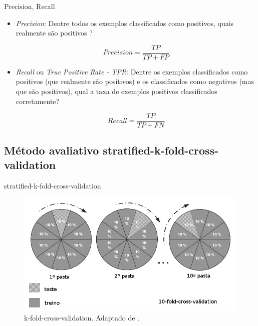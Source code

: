 \documentclass[brazil]{beamer}
\begin{document}
\begin{frame}{Precision, Recall \cite{Davis:2006}}
   \begin{itemize}
      \item <1 ->\textit{Precision}: Dentre todos os exemplos classificados como positivos, quais realmente são positivos ? 

\begin{equation} 
  Precision = \frac{TP}{TP+FP}
  \label{eq:precision}
\end{equation}

      \item <2 ->\textit{Recall} ou \textit{True Positive Rate - TPR}: Dentre os exemplos classificados como positivos (que realmente são positivos) e os classificados como negativos (mas que são positivos), qual a taxa de exemplos positivos classificados corretamente?

\begin{equation} 
  Recall = \frac{TP}{TP+FN} 
  \label{eq:recall}
\end{equation}

   \end{itemize}
\end{frame}


\subsection{Método avaliativo stratified-k-fold-cross-validation}
\begin{frame}{stratified-k-fold-cross-validation}
\begin{figure}[!htb] \centering 
  \centering
  \includegraphics[width=0.8\columnwidth]{slide/k-fold-crossvalidation} 
  \caption{k-fold-cross-validation. Adaptado de \cite{Olson:2008}.} 
  \label{fig:k-fold-crossvalidation}
\end{figure}
\end{frame}
\end{document}
